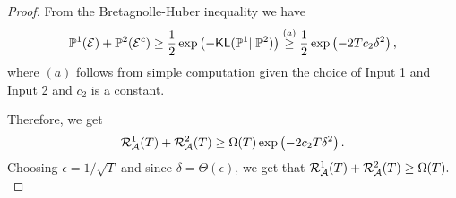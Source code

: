 \begin{proof}
From the Bretagnolle-Huber inequality \cite{lattimore2020bandit}
 we have 
$${\mathbb{P}}^1(\mathcal{E}) + {\mathbb{P}}^2(\mathcal{E}^c) \ge \frac{1}{2} \exp\left(-\textsf{KL}({\mathbb{P}}^1|| {\mathbb{P}}^2)\right) \stackrel{(a)}\ge \frac{1}{2} \exp\left(- 2T c_2\delta^2\right),$$
where $(a)$ follows from simple computation given the choice of Input 1 and Input 2 and $c_2$ is a constant.

Therefore, we get 
$$\mathcal{R}_{\mathcal{A}}^1(T) + \mathcal{R}_{\mathcal{A}}^2(T) \ge \Omega(T) \exp\left(- 2c_2T \delta^2\right).$$
Choosing $\epsilon =1/\sqrt{T}$ and since $\delta=\Theta(\epsilon)$, we get that 
$\mathcal{R}_{\mathcal{A}}^1(T) + \mathcal{R}_{\mathcal{A}}^2(T) \ge \Omega(T).$
\end{proof}
